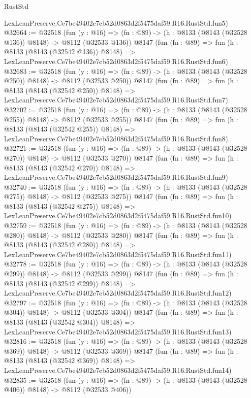 \begin{lexlean}{RustStd}
\begin{coremodule}
    LexLeanPreserve.Ce7be49402e7cb52d0863d2f5475daf59.R16.RustStd.fun5)
@32664 := @32518
    (fun (y : @16) => (fn : @89) -> (h : @8133 (@8143 (@32528 @136)) @8148) -> @8112 (@32533 @136))
    @8147
    (fun (fn : @89) =>
    fun (h : @8133 (@8143 (@32542 @136)) @8148) =>
    LexLeanPreserve.Ce7be49402e7cb52d0863d2f5475daf59.R16.RustStd.fun6)
@32683 := @32518
    (fun (y : @16) => (fn : @89) -> (h : @8133 (@8143 (@32528 @250)) @8148) -> @8112 (@32533 @250))
    @8147
    (fun (fn : @89) =>
    fun (h : @8133 (@8143 (@32542 @250)) @8148) =>
    LexLeanPreserve.Ce7be49402e7cb52d0863d2f5475daf59.R16.RustStd.fun7)
@32702 := @32518
    (fun (y : @16) => (fn : @89) -> (h : @8133 (@8143 (@32528 @255)) @8148) -> @8112 (@32533 @255))
    @8147
    (fun (fn : @89) =>
    fun (h : @8133 (@8143 (@32542 @255)) @8148) =>
    LexLeanPreserve.Ce7be49402e7cb52d0863d2f5475daf59.R16.RustStd.fun8)
@32721 := @32518
    (fun (y : @16) => (fn : @89) -> (h : @8133 (@8143 (@32528 @270)) @8148) -> @8112 (@32533 @270))
    @8147
    (fun (fn : @89) =>
    fun (h : @8133 (@8143 (@32542 @270)) @8148) =>
    LexLeanPreserve.Ce7be49402e7cb52d0863d2f5475daf59.R16.RustStd.fun9)
@32740 := @32518
    (fun (y : @16) => (fn : @89) -> (h : @8133 (@8143 (@32528 @275)) @8148) -> @8112 (@32533 @275))
    @8147
    (fun (fn : @89) =>
    fun (h : @8133 (@8143 (@32542 @275)) @8148) =>
    LexLeanPreserve.Ce7be49402e7cb52d0863d2f5475daf59.R16.RustStd.fun10)
@32759 := @32518
    (fun (y : @16) => (fn : @89) -> (h : @8133 (@8143 (@32528 @280)) @8148) -> @8112 (@32533 @280))
    @8147
    (fun (fn : @89) =>
    fun (h : @8133 (@8143 (@32542 @280)) @8148) =>
    LexLeanPreserve.Ce7be49402e7cb52d0863d2f5475daf59.R16.RustStd.fun11)
@32778 := @32518
    (fun (y : @16) => (fn : @89) -> (h : @8133 (@8143 (@32528 @299)) @8148) -> @8112 (@32533 @299))
    @8147
    (fun (fn : @89) =>
    fun (h : @8133 (@8143 (@32542 @299)) @8148) =>
    LexLeanPreserve.Ce7be49402e7cb52d0863d2f5475daf59.R16.RustStd.fun12)
@32797 := @32518
    (fun (y : @16) => (fn : @89) -> (h : @8133 (@8143 (@32528 @304)) @8148) -> @8112 (@32533 @304))
    @8147
    (fun (fn : @89) =>
    fun (h : @8133 (@8143 (@32542 @304)) @8148) =>
    LexLeanPreserve.Ce7be49402e7cb52d0863d2f5475daf59.R16.RustStd.fun13)
@32816 := @32518
    (fun (y : @16) => (fn : @89) -> (h : @8133 (@8143 (@32528 @369)) @8148) -> @8112 (@32533 @369))
    @8147
    (fun (fn : @89) =>
    fun (h : @8133 (@8143 (@32542 @369)) @8148) =>
    LexLeanPreserve.Ce7be49402e7cb52d0863d2f5475daf59.R16.RustStd.fun14)
@32835 := @32518
    (fun (y : @16) => (fn : @89) -> (h : @8133 (@8143 (@32528 @406)) @8148) -> @8112 (@32533 @406))

\end{coremodule}
\end{lexlean}
